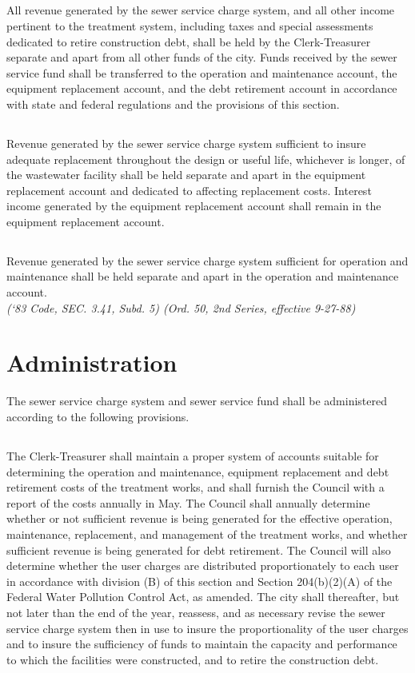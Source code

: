 \subsection{}
All revenue generated by the sewer service charge system, and all other income pertinent to the treatment system, including taxes and special assessments dedicated to retire construction debt, shall be held by the Clerk-Treasurer separate and apart from all other funds of the city.  Funds received by the sewer service fund shall be transferred to the operation and maintenance account, the equipment replacement account, and the debt retirement account in accordance with state and federal regulations and the provisions of this section.
\subsection{}
Revenue generated by the sewer service charge system sufficient to insure adequate replacement throughout the design or useful life, whichever is longer, of the wastewater facility shall be held separate and apart in the equipment replacement account and dedicated to affecting replacement costs.  Interest income generated by the equipment replacement account shall remain in the equipment replacement account.
\subsection{}
Revenue generated by the sewer service charge system sufficient for operation and maintenance shall be held separate and apart in the operation and maintenance account.\\
\emph{(‘83 Code, SEC. 3.41, Subd. 5) (Ord. 50, 2nd Series, effective 9-27-88)}
\section{Administration}
The sewer service charge system and sewer service fund shall be administered according to the following provisions.
\subsection{}
The Clerk-Treasurer shall maintain a proper system of accounts suitable for determining the operation and maintenance, equipment replacement and debt retirement costs of the treatment works, and shall furnish the Council with a report of the costs annually in May.  The Council shall annually determine whether or not sufficient revenue is being generated for the effective operation, maintenance, replacement, and management of the treatment works, and whether sufficient revenue is being generated for debt retirement. The Council will also determine whether the user charges are distributed proportionately to each user in accordance with division (B) of this section and Section 204(b)(2)(A) of the Federal Water Pollution Control Act, as amended. The city shall thereafter, but not later than the end of the year, reassess, and as necessary revise the sewer service charge system then in use to insure the proportionality of the user charges and to insure the sufficiency of funds to maintain the capacity and performance to which the facilities were constructed, and to retire the construction debt.
